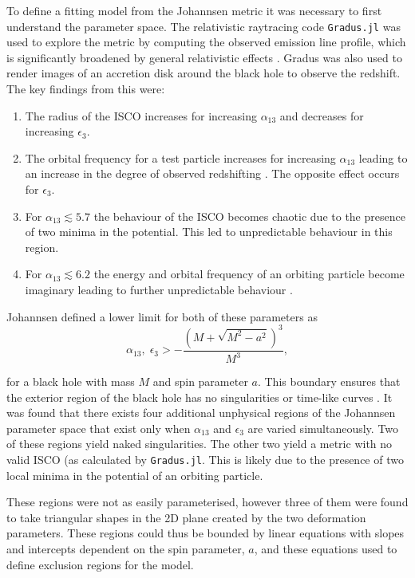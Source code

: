 \documentclass[fleqn,usenatbib]{mnras}
\begin{document}
To define a fitting model from the Johannsen metric it was necessary to first understand the parameter space. The relativistic raytracing code \verb|Gradus.jl| \cite{baker_gradusjl_2025} was used to explore the metric by computing the observed emission line profile, which is significantly broadened by general relativistic effects \cite{fabian_broad_2000}. Gradus was also used to render images of an accretion disk around the black hole to observe the redshift. The key findings from this were:
\begin{enumerate}
\item The radius of the ISCO increases for increasing $\alpha_{13}$ and decreases for increasing $\epsilon_{3}$.
\item The orbital frequency for a test particle increases for increasing $\alpha_{13}$ leading to an increase in the degree of observed redshifting \cite{johannsen_regular_2013}. The opposite effect occurs for $\epsilon_{3}$.
\item For $\alpha_{13}\lesssim 5.7$ the behaviour of the ISCO becomes chaotic due to the presence of two minima in the potential. This led to unpredictable behaviour in this region.
\item For $\alpha_{13}\lesssim 6.2$ the energy and orbital frequency of an orbiting particle become imaginary leading to further unpredictable behaviour \cite{johannsen_regular_2013}.
\end{enumerate}

Johannsen defined a lower limit for both of these parameters as
\begin{equation}
\alpha_{13},\;\epsilon_{3} > -\frac{(M + \sqrt{M^2 - a^2})^3}{M^3},
\end{equation}

for a black hole with mass $M$ and spin parameter $a$. This boundary ensures that the exterior region of the black hole has no singularities or time-like curves \cite{johannsen_regular_2013}. It was found that there exists four additional unphysical regions of the Johannsen parameter space that exist only when $\alpha_{13}$ and $\epsilon_{3}$ are varied simultaneously. Two of these regions yield naked singularities. The other two yield a metric with no valid ISCO (as calculated by \verb|Gradus.jl|. This is likely due to the presence of two local minima in the potential of an orbiting particle. 

These regions were not as easily parameterised, however three of them were found to take triangular shapes in the 2D plane created by the two deformation parameters. These regions could thus be bounded by linear equations with slopes and intercepts dependent on the spin parameter, $a$, and these equations used to define exclusion regions for the model. 
\end{document}
